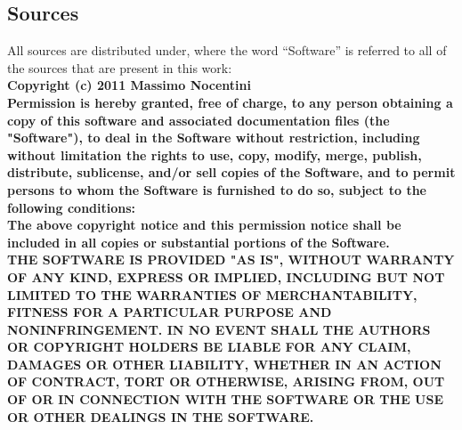 \subsection*{Sources}
All sources are distributed under, where the word ``Software'' is
referred to all of the sources that are present in this work: \\
\textbf{
  Copyright (c) 2011 Massimo Nocentini\\
  Permission is hereby granted, free of charge, to any person
  obtaining a copy of this software and associated documentation files
  (the "Software"), to deal in the Software without restriction,
  including without limitation the rights to use, copy, modify, merge,
  publish, distribute, sublicense, and/or sell copies of the Software,
  and to permit persons to whom the Software is furnished
  to do so, subject to the following conditions:\\
  The above copyright notice and this permission notice shall be
  included in all
  copies or substantial portions of the Software.\\
  THE SOFTWARE IS PROVIDED "AS IS", WITHOUT WARRANTY OF ANY KIND,
  EXPRESS OR IMPLIED, INCLUDING BUT NOT LIMITED TO THE WARRANTIES OF
  MERCHANTABILITY, FITNESS FOR A PARTICULAR PURPOSE AND
  NONINFRINGEMENT. IN NO EVENT SHALL THE AUTHORS OR COPYRIGHT HOLDERS
  BE LIABLE FOR ANY CLAIM, DAMAGES OR OTHER LIABILITY, WHETHER IN AN
  ACTION OF CONTRACT, TORT OR OTHERWISE, ARISING FROM, OUT OF OR IN
  CONNECTION WITH THE SOFTWARE OR THE USE OR OTHER DEALINGS IN THE
  SOFTWARE.  }

